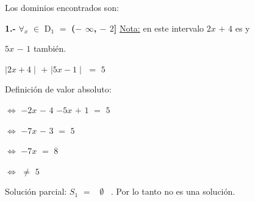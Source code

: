 \documentclass[12pt]{article}
\newenvironment{MyColorPar}[1]{%
    \leavevmode\color{#1}\ignorespaces%
}{%
}%
\begin{document}
\begin{MyColorPar}{palatinateblue}
Los dominios encontrados son:
\end{MyColorPar}

{\bfseries{1.-}} \hspace{0.2cm} $\forall$$_{x}$ $\in$ D$_{1}$ $=$ {\textcolor{wisteria}{{\bfseries{($-$ $\infty${\Large{,}} $-$ $2$]}}}} \hspace{0.5cm} {\textcolor{palatinateblue}{{\underline{Nota:}} en este intervalo $2x$ $+$ $4$ es {} y}} 

{\textcolor{palatinateblue}{$5x$ $-$ $1$ también.}}  \vspace{0.5cm}

\begin{center}
    
$\mid 2x + 4 \mid$ $+$ $\mid 5x - 1\mid$ $=$ $5$ 
\end{center}

\newpage

\begin{MyColorPar}{palatinateblue}
Definición de valor absoluto:
\end{MyColorPar}

\hspace{3cm} $\Longleftrightarrow$ \hspace{0.2cm} $-2x$ $-$ $4$ $-5x$ $+$ $1$ $=$ $5$ \vspace{0.2cm}

\hspace{3cm} $\Longleftrightarrow$ \hspace{0.2cm} $-7x$ $-$ $3$ $=$ $5$ \vspace{0.2cm}

\hspace{3cm} $\Longleftrightarrow$ \hspace{0.2cm} $-7x$ $=$ $8$ \vspace{0.2cm}

\hspace{3cm} $\Longleftrightarrow$ \hspace{0.2cm}  \hspace{0.2cm} $\neq$ \hspace{0.2cm}  $5$  \vspace{0.2cm}

\begin{MyColorPar}{verde_manzana}
Solución parcial: $S_{1}$ $=$ {\Large{\ $\emptyset$ \ }}. Por lo tanto no es una solución.
\end{MyColorPar} \vspace{0.5cm}
\end{document}
